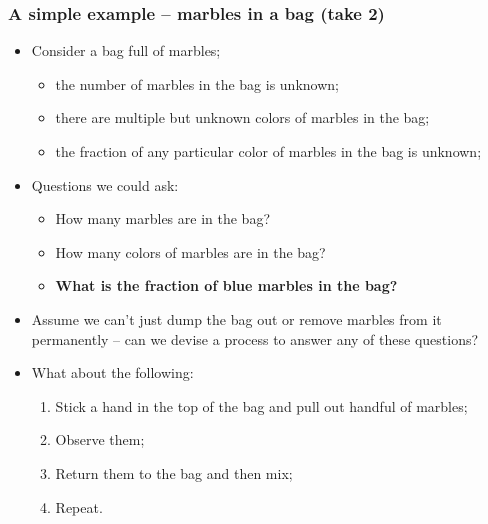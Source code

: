 \documentclass[aspectratio=169]{beamer}
\theoremstyle{principle}
\begin{document}
\begin{frame}
\frametitle{A simple example -- marbles in a bag (take 2)}

\begin{itemize}
\item Consider a bag full of marbles;
\begin{itemize}
\item the number of marbles in the bag is unknown;
\item there are multiple but unknown colors of marbles in the bag;
\item the fraction of any particular color of marbles in the bag is unknown;
\end{itemize}
\bigskip
\item Questions we could ask:
\begin{itemize}
\item How many marbles are in the bag?
\item How many colors of marbles are in the bag?
\item \textbf{What is the fraction of blue marbles in the bag?}
\end{itemize}
\bigskip
\item Assume we can't just dump the bag out or remove marbles from it permanently -- can we devise a process to answer any of these questions?
\bigskip
\item What about the following:
\begin{enumerate}
\item Stick a hand in the top of the bag and pull out handful of marbles;
\item Observe them;
\item Return them to the bag and then mix;
\item Repeat.
\end{enumerate} 
\end{itemize}

\end{frame}
\end{document}
